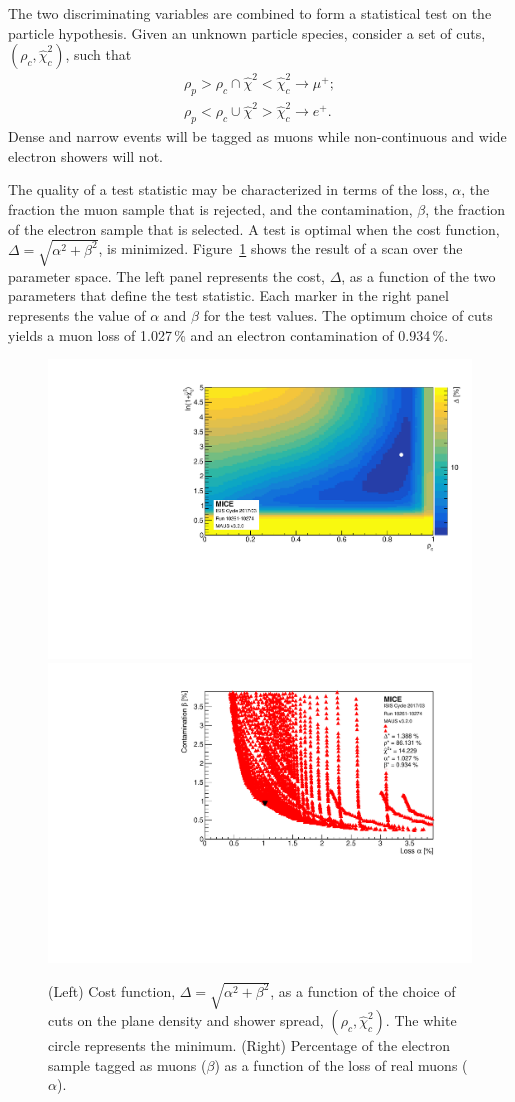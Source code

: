 The two discriminating variables are combined to form a statistical test on the particle hypothesis. Given an unknown particle species, consider a set of cuts, $(\rho_c,\hat{\chi}^2_c)$, such that
\begin{equation}
\begin{gathered}
\rho_p>\rho_c \cap \hat{\chi}^2<\hat{\chi}^2_c  \rightarrow  \mu^+; \\
\rho_p<\rho_c \cup \hat{\chi}^2>\hat{\chi}^2_c \rightarrow  e^+.
\end{gathered}
\end{equation}
Dense and narrow events will be tagged as muons while non-continuous and wide electron showers will not. 

The quality of a test statistic may be characterized in terms of the loss, $\alpha$, the fraction the muon sample that is rejected, and the contamination, $\beta$, the fraction of the electron sample that is selected. A test is optimal when the cost function, $\Delta=\sqrt{\alpha^2+\beta^2}$, is minimized. Figure~\ref{fig:emr_pid_eff} shows the result of a scan over the parameter space. The left panel represents the cost, $\Delta$, as a function of the two parameters that define the test statistic. Each marker in the right panel represents the value of $\alpha$ and $\beta$ for the test values. The optimum choice of cuts yields a muon loss of 1.027\,\% and an electron contamination of 0.934\,\%.

\begin{figure}[htb!]
	\begin{center}
		\includegraphics[width=0.49\columnwidth]{pid_loss.pdf}
		\hfill
		\includegraphics[width=0.49\columnwidth]{pid_multi.pdf}
		\caption{(Left) Cost function, $\Delta=\sqrt{\alpha^2+\beta^2}$, as a function of the choice of cuts on the plane density and shower spread, $(\rho_c,\hat{\chi}^2_c)$. The white circle represents the minimum. (Right) Percentage of the electron sample tagged as muons ($\beta$) as a function of the loss of real muons ($\alpha$).}
		\label{fig:emr_pid_eff}
	\end{center}
\end{figure}

